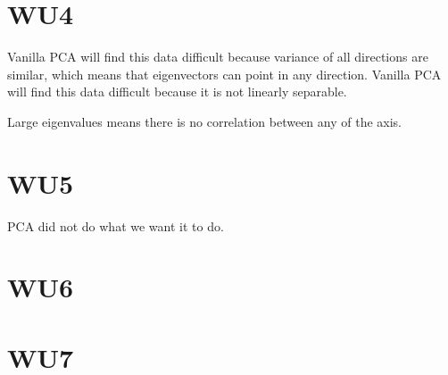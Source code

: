\section*{WU4}
Vanilla PCA will find this data difficult because variance of all directions are similar, 
which means that eigenvectors can point in any direction. 
Vanilla PCA will find this data difficult because it is not linearly separable.

Large eigenvalues means there is no correlation between any of the axis. 

\section*{WU5}
PCA did not do what we want it to do. 

\section*{WU6}

\section*{WU7}

